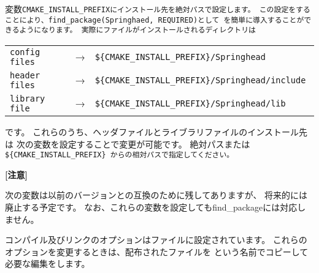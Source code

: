 変数\tt{CMAKE\_INSTALL\_PREFIX}にインストール先を絶対パスで設定します。
この設定をすることにより、\tt{find\_package(Springhaed, REQUIRED)}として
\SprLib を簡単に導入することができるようになります。
\medskip
実際にファイルがインストールされるディレクトリは
\def\IP{\$\{CMAKE\_INSTALL\_PREFIX\}}
\begin{narrow}[s]
	\begin{tabular}{lcl}
		\tt{config files} & → & \tt{\IP/Springhead} \\
		\tt{header files} & → & \tt{\IP/Springhead/include} \\
		\tt{library file} & → & \tt{\IP/Springhead/lib} \\
	\end{tabular}
\end{narrow}
です。
これらのうち、ヘッダファイルとライブラリファイルのインストール先は
次の変数を設定することで変更が可能です。
絶対パスまたは\tt{\,\IP\,}からの相対パスで指定してください。

\bigskip
\small{\bf{[注意]}}

\begin{narrow}[s]
	次の変数は以前のバージョンとの互換のために残してありますが、
	将来的には廃止する予定です。
	なお、これらの変数を設定してもfind\_packageには対応しません。
\end{narrow}

\bigskip
コンパイル及びリンクのオプションはファイルに設定されています。
これらのオプションを変更するときは、配布されたファイルを
\QCMakeOpts{}という名前でコピーして必要な編集をします。


